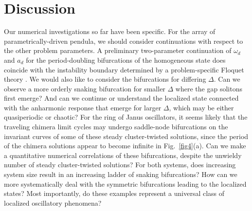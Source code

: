 \documentclass[aps,pre,amsmath,amssymb,floatfix,onecolumn,notitlepage,10pt]{revtex4-1}
\begin{document}
\section{Discussion}
Our numerical investigations so far have been specific. For the array of parametrically-driven pendula, we should consider continuations with respect to the other problem parameters. A preliminary two-parameter continuation of $\omega_d$ and $a_d$ for the period-doubling bifurcations of the homogeneous state does coincide with the instability boundary determined by a problem-specific Floquet theory \cite{2021_Nicolaou_1,2021_Nicolaou_2}. We would also like to consider the bifurcations for differing $\Delta$. Can we observe a more orderly snaking bifurcation for smaller $\Delta$ where the gap solitons first emerge? And can we continue or understand the localized state connected with the anharmonic response that emerge for larger $\Delta$, which may be either quasiperiodic or chaotic? For the ring of Janus oscillators, it seems likely that the traveling chimera limit cycles may undergo saddle-node bifurcations on the invariant curves of some of these steady cluster-twisted solutions, since the period of the chimera solutions appear to become infinite in Fig.~\ref{fig4}(a).  Can we make a quantitative numerical correlations of these bifurcations, despite the unwieldy number of steady cluster-twisted solutions?  For both systems, does increasing system size result in an increasing ladder of snaking bifurcations? How can we more systematically deal with the symmetric bifurcations leading to the localized states? Most importantly, do these examples represent a universal class of localized oscillatory phenomena?  
\end{document}
